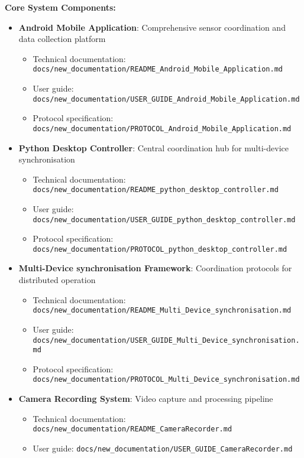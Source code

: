\documentclass[11pt,a4paper]{report}
\begin{document}
\textbf{Core System Components:}
\begin{itemize}
  \item \textbf{Android Mobile Application}: Comprehensive sensor coordination and data collection platform  
    \begin{itemize}
      \item Technical documentation: \texttt{docs/new\_documentation/README\_Android\_Mobile\_Application.md}
      \item User guide: \texttt{docs/new\_documentation/USER\_GUIDE\_Android\_Mobile\_Application.md}
      \item Protocol specification: \texttt{docs/new\_documentation/PROTOCOL\_Android\_Mobile\_Application.md}
    \end{itemize}
  \item \textbf{Python Desktop Controller}: Central coordination hub for multi-device synchronisation  
    \begin{itemize}
      \item Technical documentation: \texttt{docs/new\_documentation/README\_python\_desktop\_controller.md}
      \item User guide: \texttt{docs/new\_documentation/USER\_GUIDE\_python\_desktop\_controller.md}
      \item Protocol specification: \texttt{docs/new\_documentation/PROTOCOL\_python\_desktop\_controller.md}
    \end{itemize}
  \item \textbf{Multi-Device synchronisation Framework}: Coordination protocols for distributed operation  
    \begin{itemize}
      \item Technical documentation: \texttt{docs/new\_documentation/README\_Multi\_Device\_synchronisation.md}
      \item User guide: \texttt{docs/new\_documentation/USER\_GUIDE\_Multi\_Device\_synchronisation.md}
      \item Protocol specification: \texttt{docs/new\_documentation/PROTOCOL\_Multi\_Device\_synchronisation.md}
    \end{itemize}
  \item \textbf{Camera Recording System}: Video capture and processing pipeline  
    \begin{itemize}
      \item Technical documentation: \texttt{docs/new\_documentation/README\_CameraRecorder.md}
      \item User guide: \texttt{docs/new\_documentation/USER\_GUIDE\_CameraRecorder.md}

\end{itemize}
\end{itemize}
\end{document}
